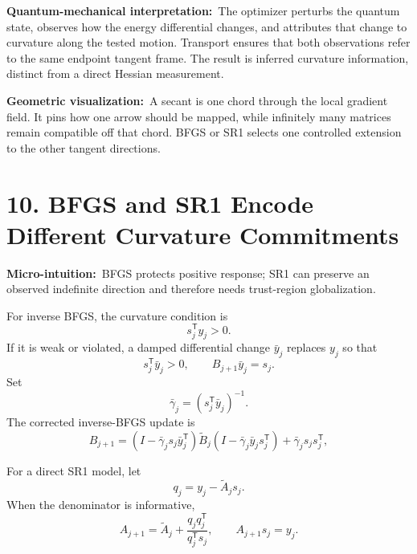 \documentclass[10pt,twocolumn]{article}
\newcommand{\micro}[1]{\par\noindent\textbf{Micro-intuition:}\ #1\par}
\newcommand{\phys}[1]{\par\noindent\textbf{Quantum-mechanical interpretation:}\ #1\par}
\newcommand{\geom}[1]{\par\noindent\textbf{Geometric visualization:}\ \textcolor{teal!70!black}{#1}\par}
\newcommand{\conceptbreak}{\par\medskip\noindent{\color{black!30}\rule{\columnwidth}{0.35pt}}\par\medskip}
\begin{document}
\phys{The optimizer perturbs the quantum state, observes how the energy
differential changes, and attributes that change to curvature along the tested
motion. Transport ensures that both observations refer to the same endpoint
tangent frame. The result is inferred curvature information, distinct from a
direct Hessian measurement.}

\geom{A secant is one chord through the local gradient field. It pins how one
arrow should be mapped, while infinitely many matrices remain compatible off
that chord. BFGS or SR1 selects one controlled extension to the other tangent
directions.}

\conceptbreak

\section*{10. BFGS and SR1 Encode Different Curvature Commitments}

\micro{BFGS protects positive response; SR1 can preserve an observed indefinite
direction and therefore needs trust-region globalization.}

For inverse BFGS, the curvature condition is
\begin{equation}
s_j^{\mathsf T}y_j>0.
\label{eq:positive-curvature}
\end{equation}
If it is weak or violated, a damped differential change \(\bar y_j\) replaces
\(y_j\) so that
\begin{equation}
s_j^{\mathsf T}\bar y_j>0,
\qquad
B_{j+1}\bar y_j=s_j.
\label{eq:damped-secant}
\end{equation}
Set
\begin{equation}
\bar\gamma_j=(s_j^{\mathsf T}\bar y_j)^{-1}.
\label{eq:damped-bfgs-scale}
\end{equation}
The corrected inverse-BFGS update is
\begin{equation}
\boxed{
B_{j+1}
=(I-\bar\gamma_js_j\bar y_j^{\mathsf T})\widetilde B_j
(I-\bar\gamma_j\bar y_js_j^{\mathsf T})
+\bar\gamma_js_js_j^{\mathsf T},}
\label{eq:damped-bfgs-update}
\end{equation}

For a direct SR1 model, let
\begin{equation}
q_j=y_j-\widetilde A_js_j.
\label{eq:sr1-residual}
\end{equation}
When the denominator is informative,
\begin{equation}
\boxed{
A_{j+1}
=\widetilde A_j
+\frac{q_jq_j^{\mathsf T}}{q_j^{\mathsf T}s_j},
\qquad
A_{j+1}s_j=y_j.}
\label{eq:sr1-update}
\end{equation}
\end{document}
